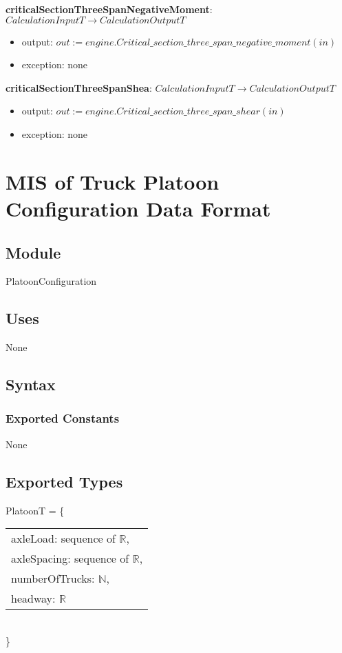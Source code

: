 \documentclass[12pt, titlepage]{article}
\begin{document}
\noindent \textbf{criticalSectionThreeSpanNegativeMoment}: $CalculationInputT \rightarrow CalculationOutputT$
\begin{itemize}
    \item output: $out := engine.Critical\_section\_three\_span\_negative\_moment(in)$
    \item exception: none
\end{itemize}

\noindent \textbf{criticalSectionThreeSpanShea}: $CalculationInputT \rightarrow CalculationOutputT$
\begin{itemize}
    \item output: $out := engine.Critical\_section\_three\_span\_shear(in)$
    \item exception: none
\end{itemize}

\newpage

\section{MIS of Truck Platoon Configuration Data Format} \label{PlatoonConfiguration} 

\subsection{Module}

PlatoonConfiguration

\subsection{Uses}
None

\subsection{Syntax}

\subsubsection{Exported Constants}
None
\subsection{Exported Types}
PlatoonT = \{\\
    \begin{tabular}{l}
	axleLoad: sequence of $\mathbb{R}$,\\
	axleSpacing: sequence of $\mathbb{R}$,\\
	numberOfTrucks: $\mathbb{N}$,\\
    headway: $\mathbb{R}$
    \end{tabular}
\\\}
\end{document}
